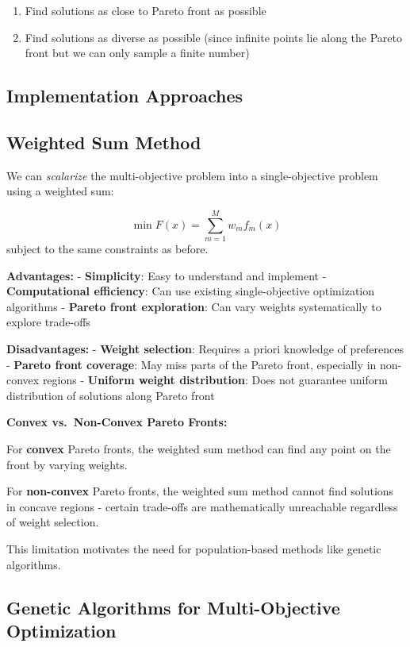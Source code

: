 \documentclass[
  letterpaper,
  DIV=11,
  numbers=noendperiod]{scrreprt}
\providecommand{\tightlist}{%
  \setlength{\itemsep}{0pt}\setlength{\parskip}{0pt}}
\begin{document}
\begin{enumerate}
\def\labelenumi{\arabic{enumi}.}
\tightlist
\item
  Find solutions as close to Pareto front as possible
\item
  Find solutions as diverse as possible (since infinite points lie along
  the Pareto front but we can only sample a finite number)
\end{enumerate}

\subsection{Implementation Approaches}\label{implementation-approaches}

\subsection{Weighted Sum Method}\label{weighted-sum-method}

We can \emph{scalarize} the multi-objective problem into a
single-objective problem using a weighted sum:

\[
\min F(x) =\sum_{m=1}^M w_m f_m(x)
\] subject to the same constraints as before.

\textbf{Advantages:} - \textbf{Simplicity}: Easy to understand and
implement - \textbf{Computational efficiency}: Can use existing
single-objective optimization algorithms - \textbf{Pareto front
exploration}: Can vary weights systematically to explore trade-offs

\textbf{Disadvantages:} - \textbf{Weight selection}: Requires a priori
knowledge of preferences - \textbf{Pareto front coverage}: May miss
parts of the Pareto front, especially in non-convex regions -
\textbf{Uniform weight distribution}: Does not guarantee uniform
distribution of solutions along Pareto front

\textbf{Convex vs.~Non-Convex Pareto Fronts:}

For \textbf{convex} Pareto fronts, the weighted sum method can find any
point on the front by varying weights.

For \textbf{non-convex} Pareto fronts, the weighted sum method cannot
find solutions in concave regions - certain trade-offs are
mathematically unreachable regardless of weight selection.

This limitation motivates the need for population-based methods like
genetic algorithms.

\subsection{Genetic Algorithms for Multi-Objective
Optimization}\label{genetic-algorithms-for-multi-objective-optimization}
\end{document}
